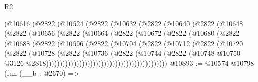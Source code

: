 \begin{lexlean}{R2}
\begin{coremodule}
                      (@10616
                        (@2822
                          (@10624
                            (@2822
                              (@10632
                                (@2822
                                  (@10640
                                    (@2822
                                      (@10648
                                        (@2822
                                          (@10656
                                            (@2822
                                              (@10664
                                                (@2822
                                                  (@10672
                                                    (@2822
                                                      (@10680
                                                        (@2822
                                                          (@10688
                                                            (@2822
                                                              (@10696
                                                                (@2822
                                                                  (@10704
                                                                    (@2822
                                                                      (@10712
                                                                        (@2822
                                                                          (@10720
                                                                            (@2822
                                                                              (@10728
                                                                                (@2822
                                                                                  (@10736
                                                                                    (@2822
                                                                                      (@10744
                                                                                        (@2822
                                                                                          (@10748
                                                                                            @10750
                                                                                            @3126
                                                                                            @2818))))))))))))))))))))))))))))))))))))))))))))
@10893 := @10574
    @10798
    (fun (__b : @2670) =>

\end{coremodule}
\end{lexlean}
